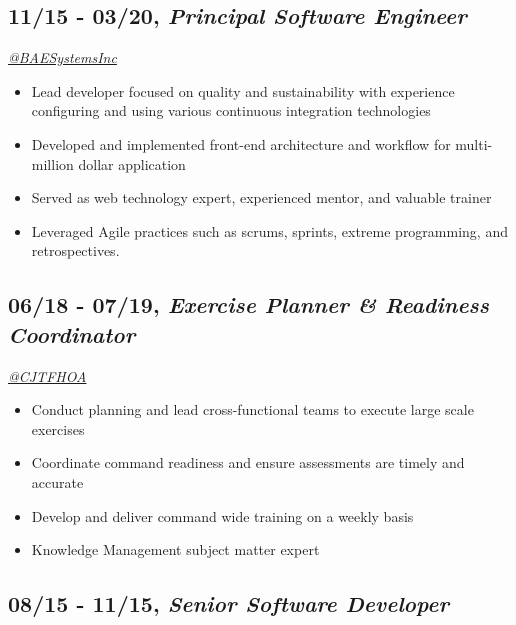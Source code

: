 \documentclass[10pt]{article}
\def\tightlist{}
\begin{document}
\hypertarget{principal-software-engineer}{%
\subsection{\texorpdfstring{11/15 - 03/20, \textbf{\emph{Principal
Software
Engineer}}}{11/15 - 03/20, Principal Software Engineer}}\label{principal-software-engineer}}

\emph{\href{https://twitter.com/BAESystemsInc}{@BAESystemsInc}}

\begin{itemize}
\tightlist
\item
  Lead developer focused on quality and sustainability with experience
  configuring and using various continuous integration technologies
\item
  Developed and implemented front-end architecture and workflow for
  multi-million dollar application
\item
  Served as web technology expert, experienced mentor, and valuable
  trainer
\item
  Leveraged Agile practices such as scrums, sprints, extreme
  programming, and retrospectives.
\end{itemize}

\hypertarget{exercise-planner-readiness-coordinator}{%
\subsection{\texorpdfstring{06/18 - 07/19, \textbf{\emph{Exercise
Planner \& Readiness
Coordinator}}}{06/18 - 07/19, Exercise Planner \& Readiness Coordinator}}\label{exercise-planner-readiness-coordinator}}

\emph{\href{https://twitter.com/CJTFHOA}{@CJTFHOA}}

\begin{itemize}
\tightlist
\item
  Conduct planning and lead cross-functional teams to execute large
  scale exercises
\item
  Coordinate command readiness and ensure assessments are timely and
  accurate
\item
  Develop and deliver command wide training on a weekly basis
\item
  Knowledge Management subject matter expert
\end{itemize}

\hypertarget{senior-software-developer}{%
\subsection{\texorpdfstring{08/15 - 11/15, \textbf{\emph{Senior Software
Developer}}}{08/15 - 11/15, Senior Software Developer}}\label{senior-software-developer}}
\end{document}
